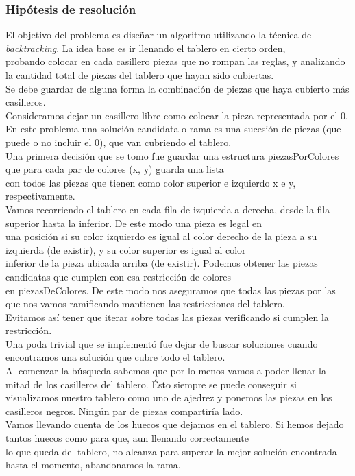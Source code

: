 \documentclass[11pt, a4paper, twoside]{article}
\begin{document}
\subsubsection{Hipótesis de resolución}
El objetivo del problema es diseñar un algoritmo utilizando la técnica de \textit{backtracking}. La idea base es ir llenando el tablero en cierto orden, \\
probando colocar en cada casillero piezas que no rompan las reglas, y analizando la cantidad total de piezas del tablero que hayan sido cubiertas.\\
Se debe guardar de alguna forma la combinación de piezas que haya cubierto más casilleros. \\
Consideramos dejar un casillero libre como colocar la pieza representada por el 0.\\
En este problema una solución candidata o rama es una sucesión de piezas (que puede o no incluir el 0), que van cubriendo el tablero.\\
Una primera decisión que se tomo fue guardar una estructura piezasPorColores que para cada par de colores (x, y) guarda una lista \\
con todos las piezas que tienen como color superior e izquierdo x e y, respectivamente.\\
Vamos recorriendo el tablero en cada fila de izquierda a derecha, desde la fila superior hasta la inferior. De este modo una pieza es legal en\\
una posición si su color izquierdo es igual al color derecho de la pieza a su izquierda (de existir), y su color superior es igual al color\\
inferior de la pieza ubicada arriba (de existir). Podemos obtener las piezas candidatas que cumplen con esa restricción de colores\\
en piezasDeColores. De este modo nos aseguramos que todas las piezas por las que nos vamos ramificando mantienen las restricciones del tablero.\\
Evitamos así tener que iterar sobre todas las piezas verificando si cumplen la restricción.\\
Una poda trivial que se implementó fue dejar de buscar soluciones cuando encontramos una solución que cubre todo el tablero.\\
Al comenzar la búsqueda sabemos que por lo menos vamos a poder llenar la mitad de los casilleros del tablero. Ésto siempre se puede conseguir si\\
visualizamos nuestro tablero como uno de ajedrez y ponemos las piezas en los casilleros negros. Ningún par de piezas compartiría lado.\\
Vamos llevando cuenta de los huecos que dejamos en el tablero. Si hemos dejado tantos huecos como para que, aun llenando correctamente\\
lo que queda del tablero, no alcanza para superar la mejor solución encontrada hasta el momento, abandonamos la rama.\\
\end{document}
